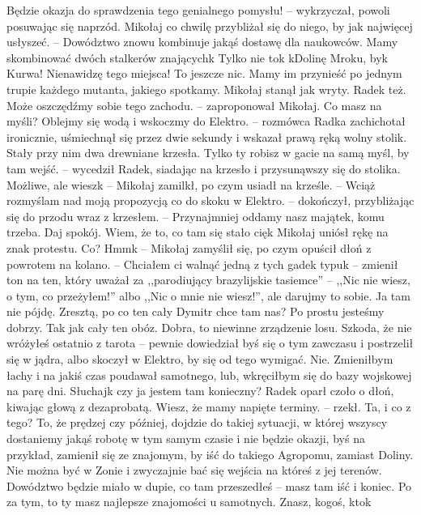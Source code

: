 \documentclass[../MAIN.tex]{subfiles}
\begin{document}
\sx Będzie okazja do sprawdzenia tego genialnego pomysłu! -- wykrzyczał, powoli posuwając się naprzód. Mikołaj co chwilę przybliżał się do niego, by jak najwięcej usłyszeć. -- Dowództwo znowu kombinuje jakąś dostawę dla naukowców. Mamy skombinować dwóch stalkerów znających\3k
\xx Tylko nie to\3k
\xx \3kDolinę Mroku, by\3k
\xx Kurwa! Nienawidzę tego miejsca!
\xx To jeszcze nic. Mamy im przynieść po jednym trupie każdego mutanta, jakiego spotkamy.
\qd
Mikołaj stanął jak wryty. Radek też.
\sx Może oszczędźmy sobie tego zachodu. -- zaproponował Mikołaj.
\xx Co masz na myśli?
\xx Oblejmy się wodą i wskoczmy do Elektro. -- rozmówca Radka zachichotał ironicznie, uśmiechnął się przez dwie sekundy i wskazał prawą ręką wolny stolik. Stały przy nim dwa drewniane krzesła.
\xx Tylko ty robisz w gacie na samą myśl, by tam wejść. -- wycedził Radek, siadając na krzesło i przysunąwszy się do stolika.
\xx Możliwe, ale wiesz\3k -- Mikołaj zamilkł, po czym usiadł na krześle. -- Wciąż rozmyślam nad moją propozycją co do skoku w Elektro. -- dokończył, przybliżając się do przodu wraz z krzesłem. -- Przynajmniej oddamy nasz majątek, komu trzeba.
\xx Daj spokój. Wiem, że to, co tam się stało cię\3k
\qd
Mikołaj uniósł rękę na znak protestu.
\sx Co?
\xx Hmm\3k -- Mikołaj zamyślił się, po czym opuścił dłoń z powrotem na kolano. -- Chciałem ci walnąć jedną z tych gadek typu\3k -- zmienił ton na ten, który uważał za ,,parodiujący brazylijskie tasiemce'' -- ,,Nic nie wiesz, o tym, co przeżyłem!'' albo ,,Nic o mnie nie wiesz!'', ale darujmy to sobie. Ja tam nie pójdę. Zresztą, po co ten cały Dymitr chce tam nas?
\xx Po prostu jesteśmy dobrzy.
\xx Tak jak cały ten obóz.
\xx Dobra, to niewinne zrządzenie losu. Szkoda, że nie wróżyłeś ostatnio z tarota -- pewnie dowiedział byś się o tym zawczasu i postrzelił się w jądra, albo skoczył w Elektro, by się od tego wymigać.
\xx Nie. Zmieniłbym łachy i na jakiś czas poudawał samotnego, lub, wkręciłbym się do bazy wojskowej na parę dni. Słuchaj\3k czy ja jestem tam konieczny?
\qd
Radek oparł czoło o dłoń, kiwając głową z dezaprobatą.
\sx Wiesz, że mamy napięte terminy. -- rzekł.
\xx Ta, i co z tego?
\xx To, że prędzej czy później, dojdzie do takiej sytuacji, w której wszyscy dostaniemy jakąś robotę w tym samym czasie i nie będzie okazji, byś na przykład, zamienił się ze znajomym, by iść do takiego Agropomu, zamiast Doliny. Nie można być w Zonie i zwyczajnie bać się wejścia na któreś z jej terenów. Dowództwo będzie miało w dupie, co tam przeszedłeś -- masz tam iść i koniec. Po za tym, to ty masz najlepsze znajomości u samotnych. Znasz, kogoś, kto\3k
\end{document}
